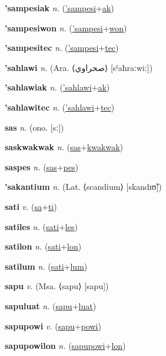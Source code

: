 \textbf{\hypertarget{'sampesiak}{'sampesiak}} \textit{n.} (\hyperlink{'sampesi}{'sampesi}+\allowbreak \hyperlink{ak}{ak})


\textbf{\hypertarget{'sampesiwon}{'sampesiwon}} \textit{n.} (\hyperlink{'sampesi}{'sampesi}+\allowbreak \hyperlink{won}{won})


\textbf{\hypertarget{'sampesitec}{'sampesitec}} \textit{n.} (\hyperlink{'sampesi}{'sampesi}+\allowbreak \hyperlink{tec}{tec})


\textbf{\hypertarget{'sahlawi}{'sahlawi}} \textit{n.} (Ara. ⟨{\arabics{}صحراوي}⟩ [sˤaħraːwiː])


\textbf{\hypertarget{'sahlawiak}{'sahlawiak}} \textit{n.} (\hyperlink{'sahlawi}{'sahlawi}+\allowbreak \hyperlink{ak}{ak})


\textbf{\hypertarget{'sahlawitec}{'sahlawitec}} \textit{n.} (\hyperlink{'sahlawi}{'sahlawi}+\allowbreak \hyperlink{tec}{tec})


\textbf{\hypertarget{sas}{sas}} \textit{n.} (ono. [sː])


\textbf{\hypertarget{saskwakwak}{saskwakwak}} \textit{n.} (\hyperlink{sas}{sas}+\allowbreak \hyperlink{kwakwak}{kwakwak})


\textbf{\hypertarget{saspes}{saspes}} \textit{n.} (\hyperlink{sas}{sas}+\allowbreak \hyperlink{pes}{pes})


\textbf{\hypertarget{'sakantium}{'sakantium}} \textit{n.} (Lat. ⟨scandium⟩ [skandɪʊ̃])


\textbf{\hypertarget{sati}{sati}} \textit{v.} (\hyperlink{sa}{sa}+\allowbreak \hyperlink{ti}{ti})


\textbf{\hypertarget{satiles}{satiles}} \textit{n.} (\hyperlink{sati}{sati}+\allowbreak \hyperlink{les}{les})


\textbf{\hypertarget{satilon}{satilon}} \textit{n.} (\hyperlink{sati}{sati}+\allowbreak \hyperlink{lon}{lon})


\textbf{\hypertarget{satilum}{satilum}} \textit{n.} (\hyperlink{sati}{sati}+\allowbreak \hyperlink{lum}{lum})


\textbf{\hypertarget{sapu}{sapu}} \textit{v.} (Msa. ⟨sapu⟩ [sapu])


\textbf{\hypertarget{sapuluat}{sapuluat}} \textit{n.} (\hyperlink{sapu}{sapu}+\allowbreak \hyperlink{luat}{luat})


\textbf{\hypertarget{sapupowi}{sapupowi}} \textit{v.} (\hyperlink{sapu}{sapu}+\allowbreak \hyperlink{powi}{powi})


\textbf{\hypertarget{sapupowilon}{sapupowilon}} \textit{n.} (\hyperlink{sapupowi}{sapupowi}+\allowbreak \hyperlink{lon}{lon})


